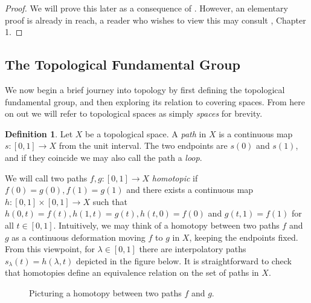 \documentclass{article}
\theoremstyle{definition}
\newtheorem{definition}[theorem]{Definition}
\theoremstyle{remark}
\theoremstyle{plain}
\begin{document}
\begin{proof}
	We will prove this later as a consequence of . 
	However, an elementary proof is already in reach, a reader who wishes to view this may consult \cite{Szamuely}, Chapter 1.
\end{proof}

\subsection{The Topological Fundamental Group}
We now begin a brief journey into topology by first defining the topological fundamental group, and then exploring its relation to covering spaces.
From here on out we will refer to topological spaces as simply \textit{spaces} for brevity.


\begin{definition}
	Let $X$ be a topological space. 
	A \textit{path} in $X$ is a continuous map $s: [0,1] \to X$ from the unit interval.
	The two endpoints are $s(0)$ and $s(1)$, and if they coincide we may also call the path a \textit{loop}.
\end{definition}

We will call two paths $f,g: [0,1] \to X$ \textit{homotopic} if $f(0) = g(0), f(1) = g(1)$ and there exists a continuous map $h: [0,1] \times [0,1] \to X$ such that $h(0,t) = f(t), h(1,t) = g(t), h(t,0) = f(0)$ and $g(t,1) = f(1)$ for all $t \in [0,1]$.
Intuitively, we may think of a homotopy between two paths $f$ and $g$ as a continuous deformation moving $f$ to $g$ in $X$, keeping the endpoints fixed.
From this viewpoint, for $\lambda \in [0,1]$ there are interpolatory paths $s_{\lambda}(t) = h(\lambda, t)$ depicted in the figure below.
It is straightforward to check that homotopies define an equivalence relation on the set of paths in $X$.\\

\begin{figure}[!h]
	\centering
{}
\caption{Picturing a homotopy between two paths $f$ and $g$.}
\end{figure}
\end{document}

